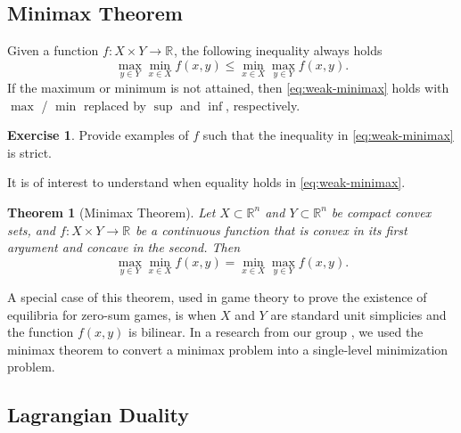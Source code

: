 \documentclass[
]{book}
\newtheorem{theorem}{Theorem}[chapter]
\theoremstyle{definition}
\theoremstyle{definition}
\theoremstyle{definition}
\newtheorem{exercise}{Exercise}[chapter]
\theoremstyle{definition}
\theoremstyle{remark}
\begin{document}
\subsection{Minimax Theorem}\label{minimax-theorem}

Given a function \(f: X \times Y \rightarrow \mathbb{R}^{}\), the following inequality always holds
\begin{equation}
\max_{y \in Y} \min_{x \in X} f(x,y) \leq \min_{x \in X} \max_{y \in Y} f(x,y).
\label{eq:weak-minimax}
\end{equation}
If the maximum or minimum is not attained, then \eqref{eq:weak-minimax} holds with \(\max\) / \(\min\) replaced by \(\sup\) and \(\inf\), respectively.

\begin{exercise}
Provide examples of \(f\) such that the inequality in \eqref{eq:weak-minimax} is strict.
\end{exercise}

It is of interest to understand when equality holds in \eqref{eq:weak-minimax}.

\begin{theorem}[Minimax Theorem]
\protect\hypertarget{thm:minimax}{}\label{thm:minimax}Let \(X \subset \mathbb{R}^{n}\) and \(Y \subset \mathbb{R}^{n}\) be compact convex sets, and \(f: X \times Y \rightarrow \mathbb{R}^{}\) be a continuous function that is convex in its first argument and concave in the second. Then
\[
\max_{y \in Y} \min_{x \in X} f(x,y) = \min_{x \in X} \max_{y \in Y} f(x,y).
\]
\end{theorem}

A special case of this theorem, used in game theory to prove the existence of equilibria for zero-sum games, is when \(X\) and \(Y\) are standard unit simplicies and the function \(f(x,y)\) is bilinear. In a research from our group \citep{tang23arxiv-uncertainty}, we used the minimax theorem to convert a minimax problem into a single-level minimization problem.

\subsection{Lagrangian Duality}\label{background:convex:optimization:Lagrangian}
\end{document}
